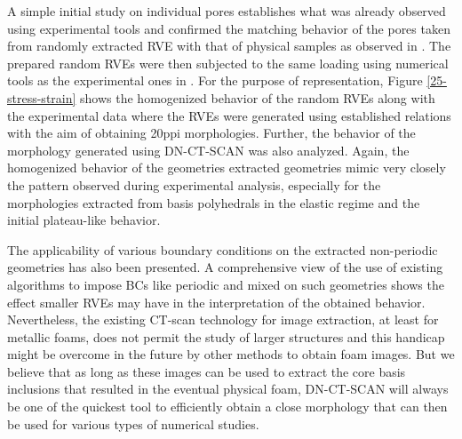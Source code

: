 A simple initial study on individual pores establishes what was already observed using experimental tools and confirmed the matching behavior of the pores taken from randomly extracted RVE with that of physical samples as observed in \cite{heinzeExperimentalNumericalInvestigation2018}. The prepared random RVEs were then subjected to the same loading using numerical tools as the experimental ones in \cite{jungMicrostructuralCharacterisationExperimental2017}. For the purpose of representation, Figure \ref{25-stress-strain} shows the homogenized behavior of the random RVEs along with the experimental data where the RVEs were generated using established relations with the aim of obtaining 20ppi morphologies. Further, the behavior of the morphology generated using DN-CT-SCAN was also analyzed. Again, the homogenized behavior of the geometries extracted geometries mimic very closely the pattern observed during experimental analysis, especially for the morphologies extracted from basis polyhedrals in the elastic regime and the initial plateau-like behavior.


The applicability of various boundary conditions on the extracted non-periodic geometries has also been presented. A comprehensive view of the use of existing algorithms to impose BCs like periodic and mixed on such geometries shows the effect smaller RVEs may have in the interpretation of the obtained behavior. Nevertheless, the existing CT-scan technology for image extraction, at least for metallic foams, does not permit the study of larger structures and this handicap might be overcome in the future by other methods to obtain foam images. But we believe that as long as these images can be used to extract the core basis inclusions that resulted in the eventual physical foam, DN-CT-SCAN will always be one of the quickest tool to efficiently obtain a close morphology that can then be used for various types of numerical studies.

